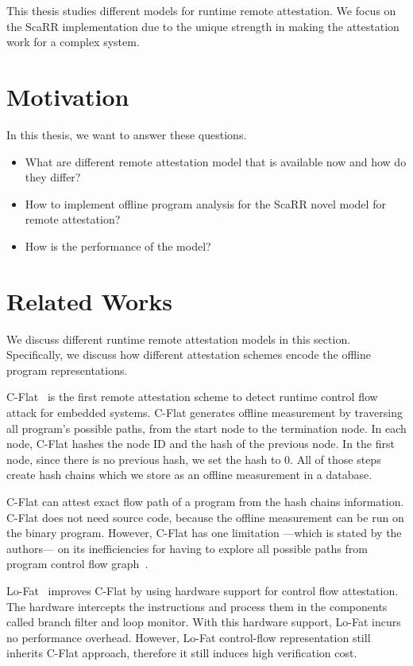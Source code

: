 This thesis studies different models for runtime remote attestation. We focus on
the ScaRR implementation due to the unique strength in making the attestation
work for a complex system.

\section{Motivation}

In this thesis, we want to answer these questions.
\begin{itemize}
    \item What are different remote attestation model that is available now and
    how do they differ?
    \item How to implement offline program analysis for the ScaRR novel model
    for remote attestation?
    \item How is the performance of the model?
\end{itemize}

\section{Related Works}

We discuss different runtime remote attestation models in this section.
Specifically, we discuss how different attestation schemes encode the offline
program representations.

C-Flat~\cite{aberaCFLATControlFlowAttestation2016} is the first remote
attestation scheme to detect runtime control flow attack for embedded systems.
C-Flat generates offline measurement by traversing all program's possible paths,
from the start node to the termination node. In each node, C-Flat hashes the
node ID and the hash of the previous node. In the first node, since there is no
previous hash, we set the hash to 0. All of those steps create hash chains which
we store as an offline measurement in a database. 

C-Flat can attest exact flow path of a program from the hash chains information.
C-Flat does not need source code, because the offline measurement can be run on
the binary program. However, C-Flat has one limitation ---which is stated by the
authors--- on its inefficiencies for having to explore all possible paths from
program control flow graph~\cite{aberaCFLATControlFlowAttestation2016}.

Lo-Fat~\cite{dessoukyLOFATLowOverheadControl2017} improves C-Flat by using
hardware support for control flow attestation. The hardware intercepts the
instructions and process them in the components called branch filter and loop
monitor. With this hardware support, Lo-Fat incurs no performance overhead.
However, Lo-Fat control-flow representation still inherits C-Flat approach,
therefore it still induces high verification cost.

